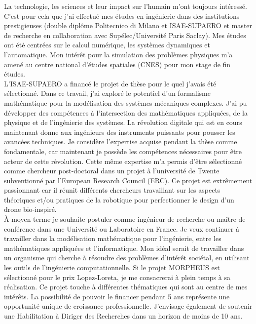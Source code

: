 \documentclass[12pt, french]{article}
\begin{document}
	La technologie, les sciences et leur impact sur l'humain m'ont toujours intéressé. C'est pour cela que j'ai effectué mes études en ingénierie dans des institutions prestigieuses (double diplôme Politecnico di Milano et ISAE-SUPAERO et master de recherche en collaboration avec Supélec/Université Paris Saclay). Mes études ont été centrées sur le calcul numérique, les systèmes dynamiques et l'automatique. Mon intérêt pour la simulation des problèmes physiques m'a amené au centre national d'études spatiales (CNES) pour mon stage de fin études. \\
	
	L'ISAE-SUPAERO a financé le projet de thèse pour le quel j'avais été sélectionné. Dans ce travail, j'ai exploré le potentiel d'un formalisme mathématique pour la modélisation des systèmes mécaniques complexes. J'ai pu développer des compétences à l'intersection des mathématiques appliquées, de la physique et de l'ingénierie des systèmes. La révolution digitale qui est en cours maintenant donne aux ingénieurs des instruments puissants pour pousser les avancées techniques. Je considère l'expertise acquise pendant la thèse comme fondamentale, car maintenant je possède les compétences nécessaires pour être acteur de cette révolution. Cette même expertise m'a permis d'être sélectionné comme chercheur post-doctoral dans un projet à l'université de Twente subventionné par l'European Research Council (ERC). Ce projet est extrêmement passionnant car il réunit différents chercheurs travaillant sur les aspects théoriques et/ou pratiques de la robotique pour perfectionner le design d'un drone bio-inspiré. \\
	
	\`A moyen terme je souhaite postuler comme ingénieur de recherche ou maître de conférence dans une Université ou Laboratoire en France. Je veux continuer à travailler dans la modélisation mathématique pour l'ingénierie, entre les mathématiques appliquées et l'informatique. Mon idéal serait de travailler dans un organisme qui cherche à résoudre des problèmes d'intérêt sociétal, en utilisant les outils de l'ingénierie computationnelle.  Si le projet MORPHEUS est sélectionné pour le prix Lopez-Loreta, je me consacrerai à plein temps à sa réalisation. Ce projet touche à différentes thématiques qui sont au centre de mes intérêts. La possibilité de pouvoir le financer pendant 5 ans représente une opportunité unique de croissance professionnelle. J'envisage également de soutenir une Habilitation à Diriger des Recherches dans un horizon de moins de 10 ans.
	
\end{document}
